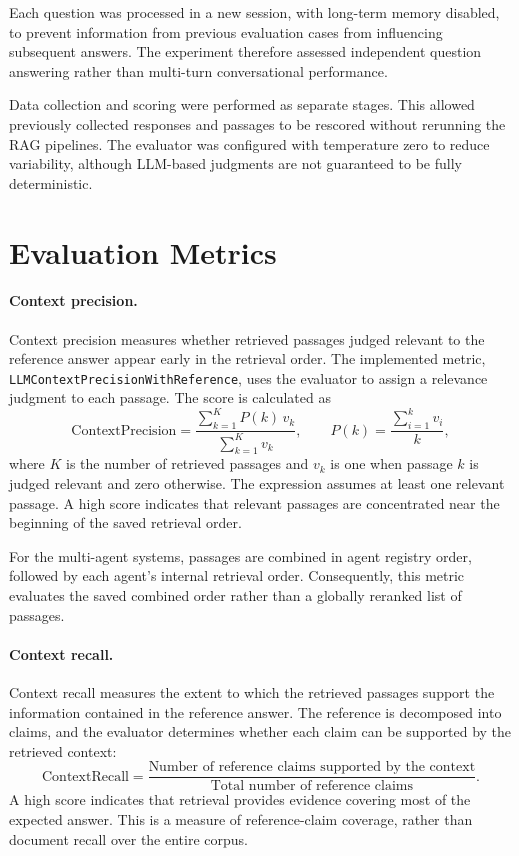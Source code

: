 \documentclass[a4paper,12pt]{report}
\begin{document}
Each question was processed in a new session, with long-term memory
disabled, to prevent information from previous evaluation cases from
influencing subsequent answers. The experiment therefore assessed
independent question answering rather than multi-turn conversational
performance.

Data collection and scoring were performed as separate stages.
This allowed previously collected responses and passages to be
rescored without rerunning the RAG pipelines. The evaluator was
configured with temperature zero to reduce variability, although
LLM-based judgments are not guaranteed to be fully deterministic.

\section{Evaluation Metrics}
\label{sec:evaluation_metrics}

\paragraph{Context precision.}
Context precision measures whether retrieved passages judged relevant
to the reference answer appear early in the retrieval order.
The implemented metric, \texttt{LLMContextPrecisionWithReference},
uses the evaluator to assign a relevance judgment to each passage.
The score is calculated as
\[
\mathrm{ContextPrecision}
=
\frac{\sum_{k=1}^{K} P(k)\,v_k}
     {\sum_{k=1}^{K} v_k},
\qquad
P(k)=\frac{\sum_{i=1}^{k}v_i}{k},
\]
where $K$ is the number of retrieved passages and $v_k$ is one
when passage $k$ is judged relevant and zero otherwise.
The expression assumes at least one relevant passage.
A high score indicates that relevant passages are concentrated
near the beginning of the saved retrieval order.

For the multi-agent systems, passages are combined in agent registry
order, followed by each agent's internal retrieval order.
Consequently, this metric evaluates the saved combined order rather
than a globally reranked list of passages.

\paragraph{Context recall.}
Context recall measures the extent to which the retrieved passages
support the information contained in the reference answer.
The reference is decomposed into claims, and the evaluator determines
whether each claim can be supported by the retrieved context:
\[
\mathrm{ContextRecall}
=
\frac{\text{Number of reference claims supported by the context}}
     {\text{Total number of reference claims}}.
\]
A high score indicates that retrieval provides evidence covering
most of the expected answer. This is a measure of reference-claim
coverage, rather than document recall over the entire corpus.
\end{document}
